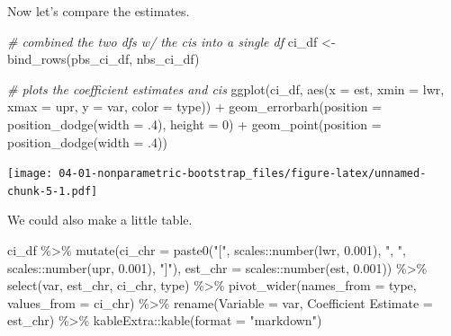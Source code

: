 \documentclass[
]{book}
\newenvironment{Shaded}{\begin{snugshade}}{\end{snugshade}}
\newcommand{\AttributeTok}[1]{\textcolor[rgb]{0.77,0.63,0.00}{#1}}
\newcommand{\CommentTok}[1]{\textcolor[rgb]{0.56,0.35,0.01}{\textit{#1}}}
\newcommand{\DecValTok}[1]{\textcolor[rgb]{0.00,0.00,0.81}{#1}}
\newcommand{\FloatTok}[1]{\textcolor[rgb]{0.00,0.00,0.81}{#1}}
\newcommand{\FunctionTok}[1]{\textcolor[rgb]{0.00,0.00,0.00}{#1}}
\newcommand{\NormalTok}[1]{#1}
\newcommand{\OtherTok}[1]{\textcolor[rgb]{0.56,0.35,0.01}{#1}}
\newcommand{\SpecialCharTok}[1]{\textcolor[rgb]{0.00,0.00,0.00}{#1}}
\newcommand{\StringTok}[1]{\textcolor[rgb]{0.31,0.60,0.02}{#1}}
\begin{document}
Now let's compare the estimates.

\begin{Shaded}
\begin{Highlighting}[]
\CommentTok{\# combined the two dfs w/ the cis into a single df}
\NormalTok{ci\_df }\OtherTok{\textless{}{-}} \FunctionTok{bind\_rows}\NormalTok{(pbs\_ci\_df, nbs\_ci\_df)}

\CommentTok{\# plots the coefficient estimates and cis}
\FunctionTok{ggplot}\NormalTok{(ci\_df, }\FunctionTok{aes}\NormalTok{(}\AttributeTok{x =}\NormalTok{ est, }\AttributeTok{xmin =}\NormalTok{ lwr, }\AttributeTok{xmax =}\NormalTok{ upr,}
                  \AttributeTok{y =}\NormalTok{ var, }\AttributeTok{color =}\NormalTok{ type)) }\SpecialCharTok{+} 
  \FunctionTok{geom\_errorbarh}\NormalTok{(}\AttributeTok{position =} \FunctionTok{position\_dodge}\NormalTok{(}\AttributeTok{width =}\NormalTok{ .}\DecValTok{4}\NormalTok{), }\AttributeTok{height =} \DecValTok{0}\NormalTok{) }\SpecialCharTok{+} 
  \FunctionTok{geom\_point}\NormalTok{(}\AttributeTok{position =} \FunctionTok{position\_dodge}\NormalTok{(}\AttributeTok{width =}\NormalTok{ .}\DecValTok{4}\NormalTok{))}
\end{Highlighting}
\end{Shaded}

\texttt{[image: 04-01-nonparametric-bootstrap\_files/figure-latex/unnamed-chunk-5-1.pdf]}

We could also make a little table.

\begin{Shaded}
\begin{Highlighting}[]
\NormalTok{ci\_df }\SpecialCharTok{\%\textgreater{}\%}
  \FunctionTok{mutate}\NormalTok{(}\AttributeTok{ci\_chr =} \FunctionTok{paste0}\NormalTok{(}\StringTok{"["}\NormalTok{, scales}\SpecialCharTok{::}\FunctionTok{number}\NormalTok{(lwr, }\FloatTok{0.001}\NormalTok{), }\StringTok{", "}\NormalTok{, scales}\SpecialCharTok{::}\FunctionTok{number}\NormalTok{(upr, }\FloatTok{0.001}\NormalTok{), }\StringTok{"]"}\NormalTok{), }
         \AttributeTok{est\_chr =}\NormalTok{ scales}\SpecialCharTok{::}\FunctionTok{number}\NormalTok{(est, }\FloatTok{0.001}\NormalTok{)) }\SpecialCharTok{\%\textgreater{}\%}
  \FunctionTok{select}\NormalTok{(var, est\_chr, ci\_chr, type) }\SpecialCharTok{\%\textgreater{}\%}
  \FunctionTok{pivot\_wider}\NormalTok{(}\AttributeTok{names\_from =}\NormalTok{ type, }\AttributeTok{values\_from =}\NormalTok{ ci\_chr) }\SpecialCharTok{\%\textgreater{}\%}
  \FunctionTok{rename}\NormalTok{(}\StringTok{\textasciigrave{}}\AttributeTok{Variable}\StringTok{\textasciigrave{}} \OtherTok{=}\NormalTok{ var, }\StringTok{\textasciigrave{}}\AttributeTok{Coefficient Estimate}\StringTok{\textasciigrave{}} \OtherTok{=}\NormalTok{ est\_chr) }\SpecialCharTok{\%\textgreater{}\%}
\NormalTok{  kableExtra}\SpecialCharTok{::}\FunctionTok{kable}\NormalTok{(}\AttributeTok{format =} \StringTok{"markdown"}\NormalTok{)}
\end{Highlighting}
\end{Shaded}
\end{document}
